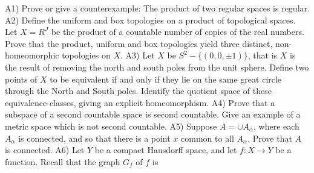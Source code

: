 \documentclass[10pt]{article}
\begin{document}
\newpage
A1) Prove or give a counterexample: The product of two regular spaces is regular.
\newpage
A2) Define the uniform and box topologies on a product of topological spaces. Let $X=R^{J}$ be the product of a countable number of copies of the real numbers. Prove that the product, uniform and box topologies yield three distinct, non-homeomorphic topologies on $X$.
\newpage
A3) Let $X$ be $S^{2}-\{(0,0, \pm 1)\}$, that is $X$ is the result of removing the north and south poles from the unit sphere. Define two points of $X$ to be equivalent if and only if they lie on the same great circle through the North and South poles. Identify the quotient space of these equivalence classes, giving an explicit homeomorphism.
\newpage
A4) Prove that a subspace of a second countable space is second countable. Give an example of a metric space which is not second countable.
\newpage
A5) Suppose $A=\cup A_{\alpha}$, where each $A_{\alpha}$ is connected, and so that there is a point $x$ common to all $A_{\alpha}$. Prove that $A$ is connected.
\newpage
A6) Let $Y$ be a compact Hausdorff space, and let $f: X \rightarrow Y$ be a function. Recall that the graph $G_{f}$ of $f$ is
\end{document}

